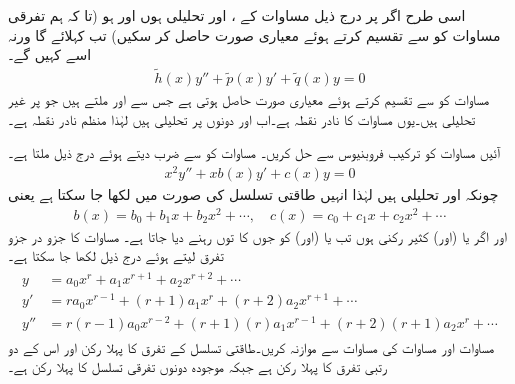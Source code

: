 اسی طرح اگر   پر درج ذیل مساوات کے ،  اور  تحلیلی ہوں اور  ہو (تا کہ ہم تفرقی مساوات کو  سے تقسیم کرتے ہوئے  معیاری صورت حاصل  کر سکیں) تب   کہلائے گا  ورنہ اسے   کہیں گے۔ 
\begin{align*}
\tilde{h}(x)y''+\tilde{p}(x)y'+\tilde{q}(x)y=0
\end{align*}
مساوات  کو  سے تقسیم کرتے ہوئے معیاری صورت حاصل ہوتی ہے جس سے  اور  ملتے ہیں جو  پر غیر تحلیلی ہیں۔یوں  مساوات کا نادر نقطہ ہے۔اب  اور  دونوں    پر تحلیلی ہیں لہٰذا  منظم نادر نقطہ ہے۔ 

آئیں مساوات  کو ترکیب فروبنیوس سے حل کریں۔ مساوات  کو  سے ضرب دیتے ہوئے درج ذیل ملتا ہے۔
\begin{align}\label{مساوات_طاقتی_فروبنیوس_پ}
x^2y''+xb(x)y'+c(x)y=0
\end{align}
چونکہ  اور  تحلیلی ہیں لہٰذا انہیں طاقتی تسلسل کی صورت میں لکھا جا سکتا ہے یعنی
\begin{align*}
b(x)=b_0+b_1x+b_2x^2+\cdots, \quad c(x)=c_0+c_1x+c_2x^2+\cdots
\end{align*}
اور اگر  یا (اور)  کثیر رکنی ہوں تب  یا (اور)  کو  جوں کا توں رہنے دیا جاتا ہے۔ مساوات  کا جزو در جزو تفرق لیتے ہوئے درج ذیل لکھا جا سکتا ہے۔
\begin{gather}
\begin{aligned}\label{مساوات_بیسل_فروبنیوس_عمومی_تفرقات}
y&=a_0x^r+a_1x^{r+1}+a_2x^{r+2}+\cdots\\
y'&=ra_0x^{r-1}+(r+1)a_1x^{r}+(r+2)a_2x^{r+1}+\cdots\\
y''&=r(r-1)a_0x^{r-2}+(r+1)(r)a_1x^{r-1}+(r+2)(r+1)a_2x^{r}+\cdots
\end{aligned}
\end{gather}
مساوات  اور مساوات  کی مساوات  سے موازنہ کریں۔طاقتی تسلسل  کے تفرق  کا پہلا رکن   اور اس کے دو رتبی تفرق کا پہلا رکن  ہے جبکہ موجودہ دونوں تفرقی تسلسل کا پہلا رکن  ہے۔ 


